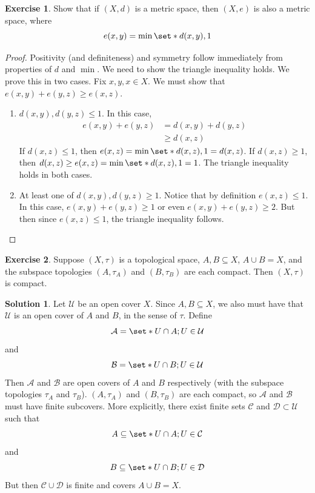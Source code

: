 \documentclass[11pt]{article}
\numberwithin{equation}{section}
\newcounter{theo}[section]\setcounter{theo}{0}
\theoremstyle{definition}
\theoremstyle{definition}
\newtheorem*{solution}{\color{Goldenrod}Solution}
\newtheorem{exercise}{\color{YellowOrange}Exercise}[section]
\def\Set{\set*}%
\def\ss{\subset}
\def\sse{\subseteq}
\newcommand{\1}{\mathbbm 1}
\def\t{\tau}
\newcommand{\cC}{\mathcal C}
\newcommand{\uU}{\mathcal U}
\begin{document}
\begin{exercise}
	Show that if $(X,d)$ is a metric space, then $(X,e)$ is also a metric space, where 
	\begin{equation}
		e(x,y) = \min\Set{d(x,y), 1}
	\end{equation}
\end{exercise}
\begin{proof}
	Positivity (and definiteness) and symmetry follow immediately from properties of $d$ and $\min$. We need to show the triangle inequality holds. We prove this in two cases. Fix $x,y,x \in X$. We must show that $e(x,y) + e(y,z) \geq e(x,z)$. 
	\begin{enumerate}
		\item $d(x,y), d(y,z) \leq 1$. In this case, 
		\begin{align*}
			e(x,y) + e(y,z) &= d(x,y) + d(y,z) \\
			&\geq d(x,z) \tag{$\triangle$ inequality with $d$}
		\end{align*}
		If $d(x,z) \leq 1$, then $e(x,z) = \min\Set{d(x,z),1} = d(x,z)$. If $d(x,z) \geq 1$, then $d(x,z) \geq e(x,z) = \min\Set{d(x,z),1} = 1$. The triangle inequality holds in both cases. 
		\item At least one of $d(x,y), d(y,z) \geq 1$. Notice that by definition $e(x,z) \leq 1$. In this case, $e(x,y) + e(y,z) \geq 1$ or even $e(x,y) + e(y,z) \geq 2$. But then since $e(x,z) \leq 1$, the triangle inequality follows. 
	\end{enumerate}
\end{proof}


\begin{exercise}
	Suppose $(X,\t)$ is a topological space, $A,B\sse X$, $A\cup B = X$, and the subspace topologies $(A,\t_A)$ and $(B,\t_B)$ are each compact. Then $(X,\t)$ is compact.  
\end{exercise}
\begin{solution}
	Let $\uU$ be an open cover $X$. Since $A,B\sse X$, we also must have that $\uU$ is an open cover of $A$ and $B$, in the sense of $\t$. Define
	\begin{equation}
		\mathcal{A} = \Set{U \cap A; U \in \uU}
	\end{equation}
	and
	\begin{equation}
		\mathcal{B} = \Set{U \cap B; U \in \uU}
	\end{equation}
	Then $\mathcal{A}$ and $\mathcal{B}$ are open covers of $A$ and $B$ respectively (with the subspace topologies $\t_A$ and $\t_B$). $(A,\t_A)$ and $(B,\t_B)$ are each compact, so $\mathcal{A}$ and $\mathcal{B}$ must have finite subcovers. More explicitly, there exist finite sets $\mathcal{C}$ and $\mathcal{D} \ss \uU$ such that 
	\begin{equation}
		A \sse \Set{U \cap A; U \in \cC} 	
	\end{equation} 
	and
	\begin{equation}
		B \sse \Set{U \cap B; U \in \mathcal{D}} 	
	\end{equation} 
	But then $\mathcal{C} \cup \mathcal{D}$ is finite and covers $A \cup B = X$. 
\end{solution}
\end{document}
